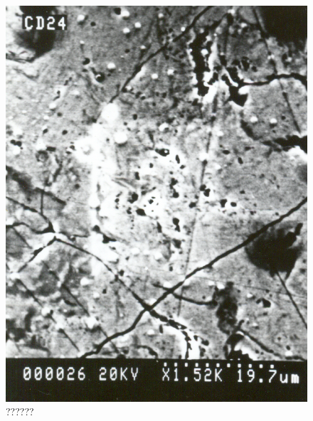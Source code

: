 \begin{figure}[H]
\renewcommand{\thefigure}{25C}
\includegraphics[scale=0.65]{images/chapter-4/fig025C.jpg}
\caption{??????}\label{chapter-4-fig25C}
\end{figure}

\newpage

